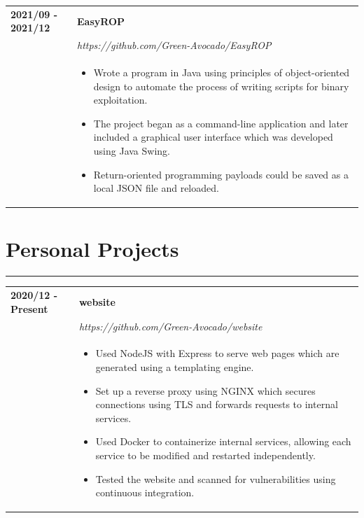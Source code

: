 \documentclass[letterpaper]{article}
\newcommand{\sect}[1]{\section*{#1}
                        {\color{cyan}
                        \rule{\textwidth}{1pt}
                        \vspace{-1ex}}}
\begin{document}
        \begin{tabular}{p{} p{}}
            \textbf{2021/09 - 2021/12} & \textbf{EasyROP} \\
            & \emph{https://github.com/Green-Avocado/EasyROP} \\
            & \begin{itemize}
                \item Wrote a program in Java using principles of object-oriented design to automate
                    the process of writing scripts for binary exploitation.
                \item The project began as a command-line application and later included a graphical user
                    interface which was developed using Java Swing.
                \item Return-oriented programming payloads could be saved as a local JSON file and
                    reloaded.
            \end{itemize}
            \\
        \end{tabular}

    \sect{Personal Projects}

        \begin{tabular}{p{} p{}}
            \textbf{2020/12 - Present} & \textbf{website} \\
            & \emph{https://github.com/Green-Avocado/website} \\
            & \begin{itemize}
                \item Used NodeJS with Express to serve web pages which are generated using a templating
                    engine.
                \item Set up a reverse proxy using NGINX which secures connections using TLS and forwards
                    requests to internal services.
                \item Used Docker to containerize internal services, allowing each service to be modified
                    and restarted independently.
                \item Tested the website and scanned for vulnerabilities using continuous integration.
            \end{itemize}
            \\
        \end{tabular}
\end{document}
